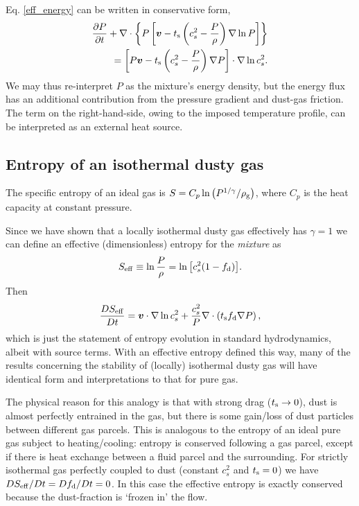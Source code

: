 Eq. \ref{eff_energy} can be written in conservative form,
\begin{align*}
  \frac{\partial P}{ \partial t} + \nabla\cdot\left\{P\left[\bm{v} -
      t_\mathrm{s}\left(c_s^2 - \frac{P}{\rho}\right)\nabla\ln{P}\right]
    \right\}\\
  = \left[P\bm{v} - t_\mathrm{s}\left(c_s^2 - \frac{P}{\rho}\right)\nabla
    P\right]\cdot\nabla\ln{c_s^2}. 
\end{align*} 
We may thus re-interpret $P$ as the mixture's energy density, but the
energy flux has an additional contribution from the pressure
gradient and dust-gas friction. The term on the right-hand-side, owing
to the imposed temperature profile, can be interpreted as an external
heat source.  


\subsection{Entropy of an isothermal dusty gas }

The specific entropy of an ideal gas is 
$S = C_p\ln{\left(P^{1/\gamma}/\rho_\mathrm{g}\right)}$, where $C_p$ is the heat 
capacity at constant pressure. 

Since we have shown that a locally isothermal dusty gas effectively has $\gamma=1$ we can define an effective (dimensionless)   
entropy for the \emph{mixture} as 
\begin{align}
   S_\mathrm{eff} \equiv \ln \frac{P}{\rho} = \ln{\left[c_s^2(1-f_\mathrm{d})\right]}.  
\end{align} 
Then 
\begin{align*}
  \frac{D S_\mathrm{eff}}{D t} = \bm{v}\cdot\nabla\ln{c_s^2} +
  \frac{c_s^2}{P}\nabla\cdot\left(t_\mathrm{s}f_\mathrm{d}\nabla P\right), 
\end{align*}
which is just the statement of entropy evolution in standard  
hydrodynamics, albeit with source terms. With an effective
entropy defined this way, many of the  
results concerning the stability of (locally) isothermal dusty gas
will have identical form and interpretations to that for pure gas.   


The physical reason for this analogy is that with strong drag
($t_\mathrm{s}\to0$), dust is almost perfectly entrained in the gas, but
there is some gain/loss of dust particles between different  
gas parcels. This is analogous to the entropy of an ideal 
pure gas subject to heating/cooling: entropy is conserved following
a gas parcel, except if there is heat exchange between a fluid parcel and the
surrounding. For strictly isothermal gas perfectly coupled to dust
(constant $c_s^2$ and $t_\mathrm{s}=0$) we have 
$DS_\mathrm{eff}/ D t = Df_\mathrm{d}/D t=0$. In this case the effective 
entropy is exactly conserved because the dust-fraction is `frozen in' the
flow. 


